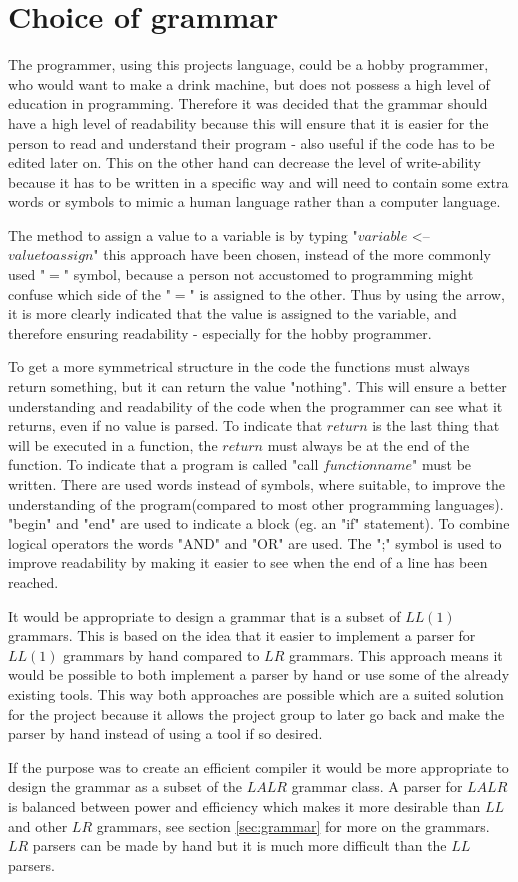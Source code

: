 \section{Choice of grammar}
The programmer, using this projects language, could be a hobby programmer, who would want to make a drink machine, but does not possess a high level of education in programming. Therefore it was decided that the grammar should have a high level of readability because this will ensure that it is easier for the person to read and understand their program - also useful if the code has to be edited later on. This on the other hand can decrease the level of write-ability because it has to be written in a specific way and will need to contain some extra words or symbols to mimic a human language rather than a computer language.


The method to assign a value to a variable is by typing "$variable$ <-- $value to assign$" this approach have been chosen, instead of the more commonly used "$=$" symbol, because a person not accustomed to programming might confuse which side of the "$=$" is assigned to the other. Thus by using the arrow, it is more clearly indicated that the value is assigned to the variable, and therefore ensuring readability - especially for the hobby programmer.

To get a more symmetrical structure in the code the functions must always return something, but it can return the value "nothing". This will ensure a better understanding and readability of the code when the programmer can see what it returns, even if no value is parsed. To indicate that $return$ is the last thing that will be executed in a function, the $return$ must always be at the end of the function. To indicate that a program is called "call $functionname$" must be written.
There are used words instead of symbols, where suitable, to improve the understanding of the program(compared to most other programming languages).
"begin" and "end" are used to indicate a block (eg. an "if" statement). To combine logical operators the words "AND" and "OR" are used. The ";" symbol is used to improve readability by making it easier to see when the end of a line has been reached.

It would be appropriate to design a grammar that is a subset of $LL(1)$ grammars. This is based on the idea that it easier to implement a parser for $LL(1)$ grammars by hand compared to $LR$ grammars. This approach means it would be possible to both implement a parser by hand or use some of the already existing tools. This way both approaches are possible which are a suited solution for the project because it allows the project group to later go back and make the parser by hand instead of using a tool if so desired.

If the purpose was to create an efficient compiler it would be more appropriate to design the grammar as a subset of the $LALR$ grammar class. A parser for $LALR$ is balanced between power and efficiency which makes it more desirable than $LL$ and other $LR$ grammars, see section \ref{sec:grammar} for more on the grammars. $LR$ parsers can be made by hand but it is much more difficult than the $LL$ parsers.